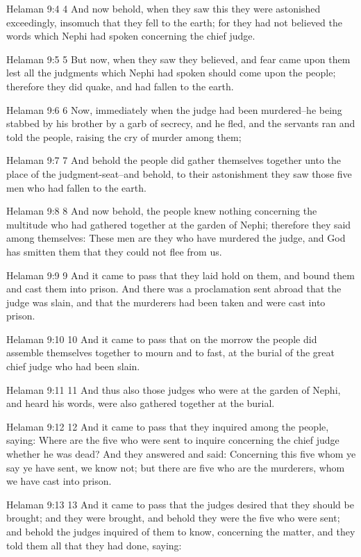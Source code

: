 Helaman 9:4
 4 And now behold, when they saw this they were astonished
exceedingly, insomuch that they fell to the earth; for they had
not believed the words which Nephi had spoken concerning the
chief judge.

Helaman 9:5
 5 But now, when they saw they believed, and fear came upon them
lest all the judgments which Nephi had spoken should come upon
the people; therefore they did quake, and had fallen to the
earth.

Helaman 9:6
 6 Now, immediately when the judge had been murdered--he being
stabbed by his brother by a garb of secrecy, and he fled, and the
servants ran and told the people, raising the cry of murder among
them;

Helaman 9:7
 7 And behold the people did gather themselves together unto the
place of the judgment-seat--and behold, to their astonishment
they saw those five men who had fallen to the earth.

Helaman 9:8
 8 And now behold, the people knew nothing concerning the
multitude who had gathered together at the garden of Nephi;
therefore they said among themselves: These men are they who have
murdered the judge, and God has smitten them that they could not
flee from us.

Helaman 9:9
 9 And it came to pass that they laid hold on them, and bound
them and cast them into prison. And there was a proclamation
sent abroad that the judge was slain, and that the murderers had
been taken and were cast into prison.

Helaman 9:10
 10 And it came to pass that on the morrow the people did
assemble themselves together to mourn and to fast, at the burial
of the great chief judge who had been slain.

Helaman 9:11
 11 And thus also those judges who were at the garden of Nephi,
and heard his words, were also gathered together at the burial.

Helaman 9:12
 12 And it came to pass that they inquired among the people,
saying: Where are the five who were sent to inquire concerning
the chief judge whether he was dead? And they answered and said:
Concerning this five whom ye say ye have sent, we know not; but
there are five who are the murderers, whom we have cast into
prison.

Helaman 9:13
 13 And it came to pass that the judges desired that they should
be brought; and they were brought, and behold they were the five
who were sent; and behold the judges inquired of them to know,
concerning the matter, and they told them all that they had done,
saying:

